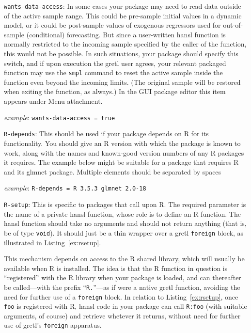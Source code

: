 \documentclass[oneside]{book}
\newcommand{\ttusage}[1]{\textit{example}: \quad \texttt{#1}}
\begin{document}
\begin{description}
\item \texttt{wants-data-access}: In some cases your package may need
  to read data outside of the active sample range. This could be
  pre-sample initial values in a dynamic model, or it could be
  post-sample values of exogenous regressors used for out-of-sample
  (conditional) forecasting.  But since a user-written hansl function
  is normally restricted to the incoming sample specified by the
  caller of the function, this would not be possible. In such
  situations, your package should specify this switch, and if upon
  execution the gretl user agrees, your relevant packaged function may
  use the \texttt{smpl} command to reset the active sample inside the
  function even beyond the incoming limits. (The original sample will
  be restored when exiting the function, as always.) In the GUI
  package editor this item appears under \textsf{Menu attachment}.

  \ttusage{wants-data-access = true}

\item \texttt{R-depends}: This should be used if your package depends
  on \textsf{R} for its functionality. You should give an \textsf{R}
  version with which the package is known to work, along with the
  names and known-good version numbers of any \textsf{R} packages it
  requires. The example below might be suitable for a package that
  requires \textsf{R} and its \textsf{glmnet} package. Multiple
  elements should be separated by spaces

  \ttusage{R-depends = R 3.5.3 glmnet 2.0-18}

\item \texttt{R-setup}: This is specific to packages that call upon
  \textsf{R}. The required parameter is the name of a private hansl
  function, whose role is to define an \textsf{R} function. The hansl
  function should take no arguments and should not return anything
  (that is, be of type \texttt{void}). It should just be a thin
  wrapper over a gretl \texttt{foreign} block, as illustrated in
  Listing~\ref{ex:rsetup}.

  This mechanism depends on access to the \textsf{R} shared library,
  which will usually be available when \textsf{R} is installed. The
  idea is that the \textsf{R} function in question is ``registered''
  with the \textsf{R} library when your package is loaded, and can
  thereafter be called---with the prefix ``\texttt{R.}''---as if were
  a native gretl function, avoiding the need for further use of a
  \texttt{foreign} block. In relation to Listing~\ref{ex:rsetup}, once
  \texttt{foo} is registered with \textsf{R}, hansl code in your
  package can call \texttt{R:foo} (with suitable arguments, of course)
  and retrieve whetever it returns, without need for further use of
  gretl's \texttt{foreign} apparatus.


\end{description}
\end{document}
